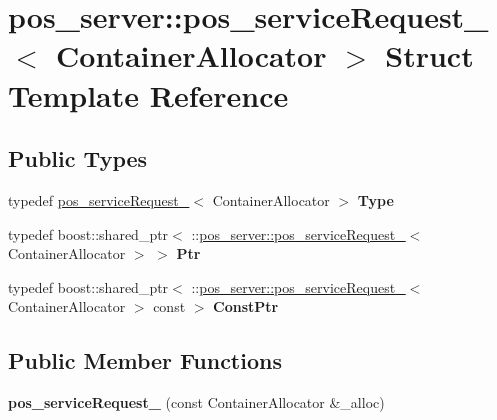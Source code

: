 \hypertarget{structpos__server_1_1pos__serviceRequest__}{}\section{pos\+\_\+server\+:\+:pos\+\_\+service\+Request\+\_\+$<$ Container\+Allocator $>$ Struct Template Reference}
\label{structpos__server_1_1pos__serviceRequest__}
\subsection*{Public Types}
\begin{DoxyCompactItemize}
\item 
\mbox{\label{structpos__server_1_1pos__serviceRequest___a2d64ee1c23c30f3e7305b3740c3fc650}} 
typedef \hyperlink{structpos__server_1_1pos__serviceRequest__}{pos\+\_\+service\+Request\+\_\+}$<$ Container\+Allocator $>$ {\bfseries Type}
\item 
\mbox{\label{structpos__server_1_1pos__serviceRequest___a96e91c1a826022307fd05872593ca7ac}} 
typedef boost\+::shared\+\_\+ptr$<$ \+::\hyperlink{structpos__server_1_1pos__serviceRequest__}{pos\+\_\+server\+::pos\+\_\+service\+Request\+\_\+}$<$ Container\+Allocator $>$ $>$ {\bfseries Ptr}
\item 
\mbox{\label{structpos__server_1_1pos__serviceRequest___a3a0a7e523d2605f6d05aa5408466e89d}} 
typedef boost\+::shared\+\_\+ptr$<$ \+::\hyperlink{structpos__server_1_1pos__serviceRequest__}{pos\+\_\+server\+::pos\+\_\+service\+Request\+\_\+}$<$ Container\+Allocator $>$ const  $>$ {\bfseries Const\+Ptr}
\end{DoxyCompactItemize}
\subsection*{Public Member Functions}
\begin{DoxyCompactItemize}
\item 
\mbox{\label{structpos__server_1_1pos__serviceRequest___a5f7edf44fbe14c6ce7e5ac8251e7bc4d}} 
{\bfseries pos\+\_\+service\+Request\+\_\+} (const Container\+Allocator \&\+\_\+alloc)
\end{DoxyCompactItemize}


